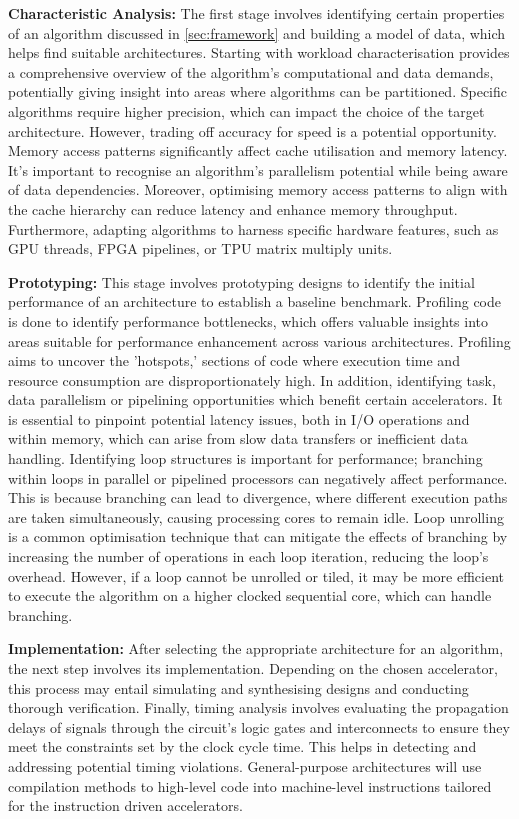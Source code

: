 \textbf{Characteristic Analysis:} The first stage involves identifying certain properties of an algorithm discussed in \ref{sec:framework} and building a model of data, which helps find suitable architectures. Starting with workload characterisation provides a comprehensive overview of the algorithm's computational and data demands, potentially giving insight into areas where algorithms can be partitioned. Specific algorithms require higher precision, which can impact the choice of the target architecture. However, trading off accuracy for speed is a potential opportunity. Memory access patterns significantly affect cache utilisation and memory latency. It's important to recognise an algorithm's parallelism potential while being aware of data dependencies. Moreover, optimising memory access patterns to align with the cache hierarchy can reduce latency and enhance memory throughput. Furthermore, adapting algorithms to harness specific hardware features, such as GPU threads, FPGA pipelines, or TPU matrix multiply units.


\textbf{Prototyping:} 
This stage involves prototyping designs to identify the initial performance of an architecture to establish a baseline benchmark. Profiling code is done to identify performance bottlenecks, which offers valuable insights into areas suitable for performance enhancement across various architectures. Profiling aims to uncover the 'hotspots,' sections of code where execution time and resource consumption are disproportionately high. In addition, identifying task, data parallelism or pipelining opportunities which benefit certain accelerators. It is essential to pinpoint potential latency issues, both in I/O operations and within memory, which can arise from slow data transfers or inefficient data handling. Identifying loop structures is important for performance; branching within loops in parallel or pipelined processors can negatively affect performance. This is because branching can lead to divergence, where different execution paths are taken simultaneously, causing processing cores to remain idle. Loop unrolling is a common optimisation technique that can mitigate the effects of branching by increasing the number of operations in each loop iteration, reducing the loop's overhead. However, if a loop cannot be unrolled or tiled, it may be more efficient to execute the algorithm on a higher clocked sequential core, which can handle branching.


\textbf{Implementation:} 
After selecting the appropriate architecture for an algorithm, the next step involves its implementation. Depending on the chosen accelerator, this process may entail simulating and synthesising designs and conducting thorough verification. Finally, timing analysis involves evaluating the propagation delays of signals through the circuit's logic gates and interconnects to ensure they meet the constraints set by the clock cycle time. This helps in detecting and addressing potential timing violations. General-purpose architectures will use compilation methods to high-level code into machine-level instructions tailored for the instruction driven accelerators.

